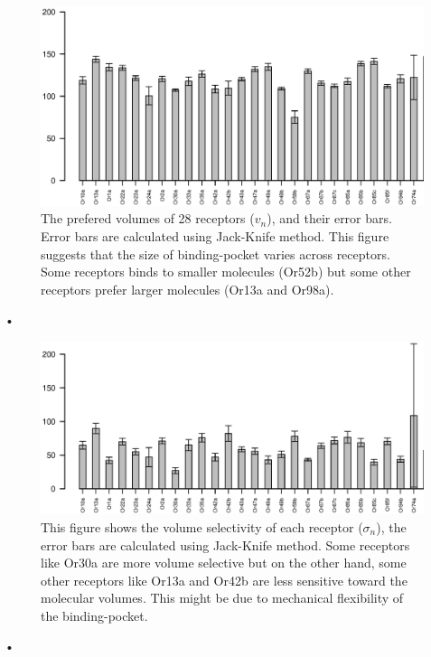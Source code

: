\documentclass[11pt]{paper} %
\begin{document}
\begin{figure}
	\includegraphics[width=\textwidth]{fig/mean-vol}
	\caption{The prefered volumes of 28 receptors ($v_n$), and their error bars. Error bars are calculated using Jack-Knife method. 
	This figure suggests that the size of binding-pocket varies across receptors. 
	Some receptors binds to smaller molecules (Or52b) but some other receptors prefer larger molecules (Or13a and Or98a).}
	\label{fig:preferred_volume}
\end{figure}•

\begin{figure}
	\includegraphics[width=\textwidth]{fig/std-vol}
	\caption{This figure shows the volume selectivity of each receptor ($\sigma_n$), the error bars are calculated using Jack-Knife method.
	Some receptors like Or30a are more volume selective but on the other hand, some other receptors like Or13a and Or42b are less sensitive toward the molecular volumes.
	This might be due to mechanical flexibility of the binding-pocket.}
	\label{fig:volume_selectivity}
\end{figure}•



\end{document}
